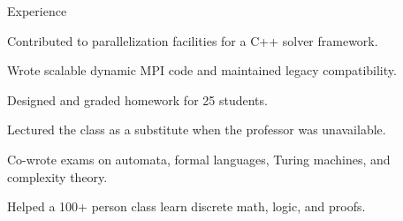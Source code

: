 \documentclass{cv}
\begin{document}

\begin{cvsection}{Experience}
  {
    \item Contributed to parallelization facilities for a C++ solver framework.
    \item Wrote scalable dynamic MPI code and maintained legacy compatibility.
  }
  {
    \item Designed and graded homework for 25 students.
    \item Lectured the class as a substitute when the professor was unavailable.
    \item Co-wrote exams on automata, formal languages, Turing machines, and complexity theory.
  }
  {
    \item Helped a 100+ person class learn discrete math, logic, and proofs.
  }
\end{cvsection}
\end{document}
